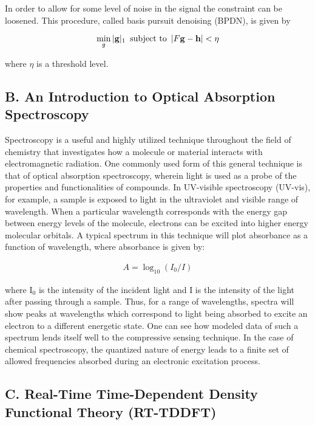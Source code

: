 \documentclass[11pt]{article}
\begin{document}
\par In order to allow for some level of noise in the signal the constraint can be loosened. This procedure, called basis pursuit denoising (BPDN), is given by

\begin{equation}\label{eq:bpdn}
    \min_{g} |\mathbf{g}|_{1} \text{ \,subject to \,} |F \mathbf{g} - \mathbf{h}| < \eta
\end{equation}

where $\eta$ is a threshold level.

\subsection*{B.	An Introduction to Optical Absorption Spectroscopy} %

\par Spectroscopy is a useful and highly utilized technique throughout the field of chemistry that investigates how a molecule or material interacts with electromagnetic radiation. One commonly used form of this general technique is that of optical absorption spectroscopy, wherein light is used as a probe of the properties and functionalities of compounds. In UV-visible spectroscopy (UV-vis), for example, a sample is exposed to light in the ultraviolet and visible range of wavelength. When a particular wavelength corresponds with the energy gap between energy levels of the molecule, electrons can be excited into higher energy molecular orbitals. A typical spectrum in this technique will plot absorbance as a function of wavelength, where absorbance is given by:

\begin{align}\label{eq:abs}
A = \log_{10}{(I_0/I)}
\end{align}

where I$_0$ is the intensity of the incident light and I is the intensity of the light after passing through a sample. Thus, for a range of wavelengths, spectra will show peaks at wavelengths which correspond to light being absorbed to excite an electron to a different energetic state. One can see how modeled data of such a spectrum lends itself well to the compressive sensing technique. In the case of chemical spectroscopy, the quantized nature of energy leads to a finite set of allowed frequencies absorbed during an electronic excitation process.

\subsection*{C.	Real-Time Time-Dependent Density Functional Theory (RT-TDDFT)} %
\end{document}
